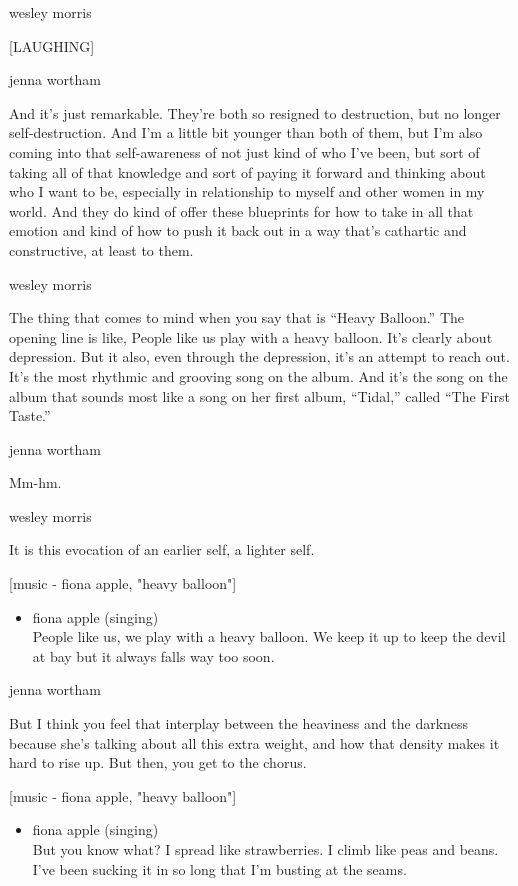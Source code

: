 wesley morris

{[}LAUGHING{]}

jenna wortham

And it's just remarkable. They're both so resigned to destruction, but
no longer self-destruction. And I'm a little bit younger than both of
them, but I'm also coming into that self-awareness of not just kind of
who I've been, but sort of taking all of that knowledge and sort of
paying it forward and thinking about who I want to be, especially in
relationship to myself and other women in my world. And they do kind of
offer these blueprints for how to take in all that emotion and kind of
how to push it back out in a way that's cathartic and constructive, at
least to them.

wesley morris

The thing that comes to mind when you say that is ``Heavy Balloon.'' The
opening line is like, People like us play with a heavy balloon. It's
clearly about depression. But it also, even through the depression, it's
an attempt to reach out. It's the most rhythmic and grooving song on the
album. And it's the song on the album that sounds most like a song on
her first album, ``Tidal,'' called ``The First Taste.''

jenna wortham

Mm-hm.

wesley morris

It is this evocation of an earlier self, a lighter self.

{[}music - fiona apple, "heavy balloon"{]}

\begin{itemize}
\tightlist
\item
  fiona apple (singing)\\
  People like us, we play with a heavy balloon. We keep it up to keep
  the devil at bay but it always falls way too soon.
\end{itemize}

jenna wortham

But I think you feel that interplay between the heaviness and the
darkness because she's talking about all this extra weight, and how that
density makes it hard to rise up. But then, you get to the chorus.

{[}music - fiona apple, "heavy balloon"{]}

\begin{itemize}
\tightlist
\item
  fiona apple (singing)\\
  But you know what? I spread like strawberries. I climb like peas and
  beans. I've been sucking it in so long that I'm busting at the seams.
\end{itemize}

